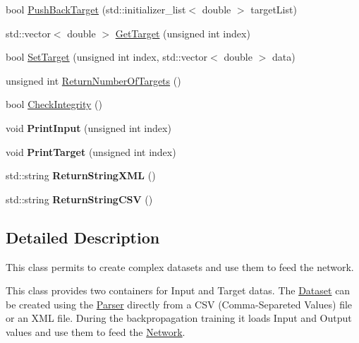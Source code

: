 \begin{DoxyCompactItemize}
\item 
bool \hyperlink{classneuroc_1_1_dataset_af82c1ebd21a48f05712fc835a4d8152b}{Push\-Back\-Target} (std\-::initializer\-\_\-list$<$ double $>$ target\-List)
\item 
std\-::vector$<$ double $>$ \hyperlink{classneuroc_1_1_dataset_a7e910db95ee24bc49c562a47a2905490}{Get\-Target} (unsigned int index)
\item 
bool \hyperlink{classneuroc_1_1_dataset_abcf67825453ff308f23c1e9c10d16138}{Set\-Target} (unsigned int index, std\-::vector$<$ double $>$ data)
\item 
unsigned int \hyperlink{classneuroc_1_1_dataset_a9d27f7fd797555dd9dce53c9fe3e4a18}{Return\-Number\-Of\-Targets} ()
\item 
bool \hyperlink{classneuroc_1_1_dataset_a6478598af89c87c39ae08ac7b9c246f8}{Check\-Integrity} ()
\item 
\hypertarget{classneuroc_1_1_dataset_a6fe9fd040ea840c87c7102061f65b056}{void {\bfseries Print\-Input} (unsigned int index)}\label{classneuroc_1_1_dataset_a6fe9fd040ea840c87c7102061f65b056}

\item 
\hypertarget{classneuroc_1_1_dataset_ac350113c98f59ccbe7c7cee7cebe9899}{void {\bfseries Print\-Target} (unsigned int index)}\label{classneuroc_1_1_dataset_ac350113c98f59ccbe7c7cee7cebe9899}

\item 
\hypertarget{classneuroc_1_1_dataset_a3890881470f70c73fbd563ace6c2682b}{std\-::string {\bfseries Return\-String\-X\-M\-L} ()}\label{classneuroc_1_1_dataset_a3890881470f70c73fbd563ace6c2682b}

\item 
\hypertarget{classneuroc_1_1_dataset_a258929c257389b017e721c82756bc1bb}{std\-::string {\bfseries Return\-String\-C\-S\-V} ()}\label{classneuroc_1_1_dataset_a258929c257389b017e721c82756bc1bb}

\end{DoxyCompactItemize}


\subsection{Detailed Description}
This class permits to create complex datasets and use them to feed the network. 

This class provides two containers for Input and Target datas. The \hyperlink{classneuroc_1_1_dataset}{Dataset} can be created using the \hyperlink{classneuroc_1_1_parser}{Parser} directly from a C\-S\-V (Comma-\/\-Separeted Values) file or an X\-M\-L file. During the backpropagation training it loads Input and Output values and use them to feed the \hyperlink{classneuroc_1_1_network}{Network}. 

